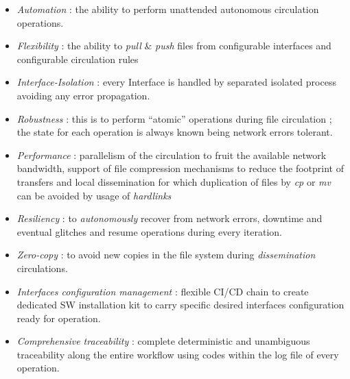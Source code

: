 \documentclass[dec_sum_main.tex]{subfiles}
\begin{document}
\begin{itemize}
	\item \textit{Automation} : the ability to perform unattended autonomous circulation operations.
	\item \textit{Flexibility} : the ability to \textit{pull} \& \textit{push} files from configurable interfaces and configurable circulation rules
	\item \textit{Interface-Isolation} : every Interface is handled by separated isolated process avoiding any error propagation.
	\item \textit{Robustness} : this is to perform “atomic” operations during file circulation ; the state for each operation is always known being network errors tolerant.
	\item \textit{Performance} : parallelism of the circulation to fruit the available network bandwidth, support of file compression mechanisms to reduce the footprint of transfers and local dissemination for which duplication of files by \textit{cp} or \textit{mv} can be avoided by usage of \textit{hardlinks}
	\item \textit{Resiliency} : to \textit{autonomously} recover from network errors, downtime and eventual glitches and resume operations during every iteration.
	\item \textit{Zero-copy} : to avoid new copies in the file system during \textit{dissemination} circulations.
    \item \textit{Interfaces configuration management} : flexible CI/CD chain to create dedicated SW installation kit to carry specific desired interfaces configuration ready for operation.	
	\item \textit{Comprehensive traceability} : complete deterministic and unambiguous traceability along the entire workflow using codes within the log file of every operation.	
\end{itemize}
\end{document}
